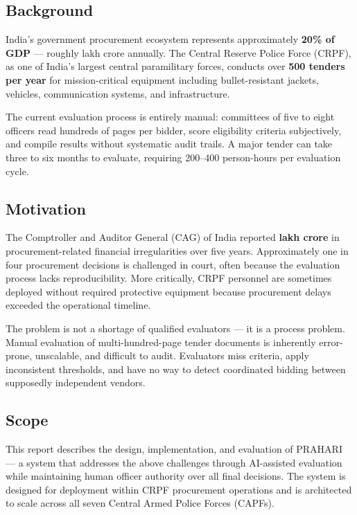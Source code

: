 \documentclass[12pt,a4paper]{article}
\begin{document}
\subsection{Background}

India's government procurement ecosystem represents approximately \textbf{20\% of GDP}
--- roughly  lakh crore annually. The Central Reserve Police Force (CRPF), as
one of India's largest central paramilitary forces, conducts over \textbf{500 tenders
per year} for mission-critical equipment including bullet-resistant jackets, vehicles,
communication systems, and infrastructure.

The current evaluation process is entirely manual: committees of five to eight
officers read hundreds of pages per bidder, score eligibility criteria subjectively,
and compile results without systematic audit trails. A major tender can take three to
six months to evaluate, requiring 200--400 person-hours per evaluation cycle.

\subsection{Motivation}

The Comptroller and Auditor General (CAG) of India reported \textbf{ lakh crore}
in procurement-related financial irregularities over five years. Approximately one in
four procurement decisions is challenged in court, often because the evaluation
process lacks reproducibility. More critically, CRPF personnel are sometimes deployed
without required protective equipment because procurement delays exceeded the
operational timeline.

The problem is not a shortage of qualified evaluators — it is a process problem.
Manual evaluation of multi-hundred-page tender documents is inherently error-prone,
unscalable, and difficult to audit. Evaluators miss criteria, apply inconsistent
thresholds, and have no way to detect coordinated bidding between supposedly
independent vendors.

\subsection{Scope}

This report describes the design, implementation, and evaluation of PRAHARI — a
system that addresses the above challenges through AI-assisted evaluation while
maintaining human officer authority over all final decisions. The system is designed
for deployment within CRPF procurement operations and is architected to scale across
all seven Central Armed Police Forces (CAPFs).
\end{document}
